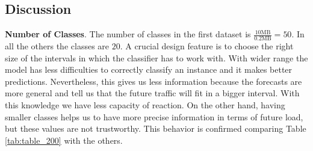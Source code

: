\documentclass[12pt]{article}
\begin{document}
\begin{table}[h!]
	\centering
	\caption{Results for \textbf{500\_D\_10}}
	\label{tab:table_500D10}
\end{table}

\restoregeometry


\subsection{Discussion}


\hspace{14pt} \textbf{Number of Classes}. 
The number of classes in the first dataset is $ \frac{10 \text{MB} } { 0.2 \text{MB}}  = 50$. 
In all the others the classes are $20$. 
A crucial design feature is to choose the right size of the intervals in which the classifier has to work with.
With wider range the model has less difficulties to correctly classify an instance and it makes better predictions. 
Nevertheless, this gives us less information because the forecasts are more general and tell us that the future traffic will fit in a bigger interval. With this knowledge we have less capacity of reaction. 
On the other hand, having smaller classes helps us to have more precise information in terms of future load, but these values are not trustworthy.
This behavior is confirmed comparing Table \ref{tab:table_200} with the others.
\end{document}
